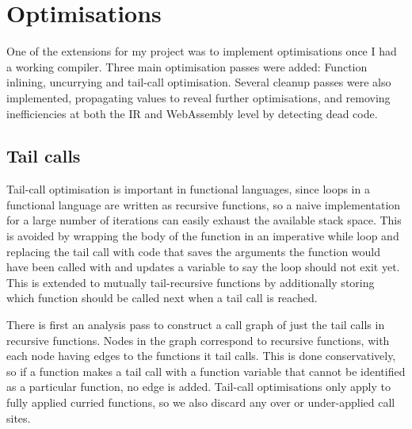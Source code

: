 \section{Optimisations}

One of the extensions for my project was to implement optimisations once I had a working compiler. Three main optimisation passes were added: Function inlining, uncurrying and tail-call optimisation. Several cleanup passes were also implemented, propagating values to reveal further optimisations, and removing inefficiencies at both the IR and WebAssembly level by detecting dead code.

\subsection{Tail calls}
Tail-call optimisation is important in functional languages, since loops in a functional language are written as recursive functions, so a naive implementation for a large number of iterations can easily exhaust the available stack space. This is avoided by wrapping the body of the function in an imperative while loop and replacing the tail call with code that saves the arguments the function would have been called with and updates a variable to say the loop should not exit yet. This is extended to mutually tail-recursive functions by additionally storing which function should be called next when a tail call is reached.

There is first an analysis pass to construct a call graph of just the tail calls in recursive functions. Nodes in the graph correspond to recursive functions, with each node having edges to the functions it tail calls. This is done conservatively, so if a function makes a tail call with a function variable that cannot be identified as a particular function, no edge is added.  Tail-call optimisations only apply to fully applied curried functions, so we also discard any over or under-applied call sites.



